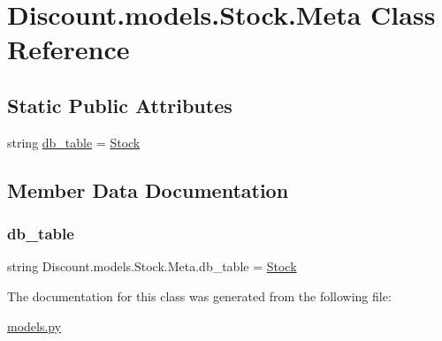 \hypertarget{class_discount_1_1models_1_1_stock_1_1_meta}{}\section{Discount.\+models.\+Stock.\+Meta Class Reference}
\label{class_discount_1_1models_1_1_stock_1_1_meta}
\subsection*{Static Public Attributes}
\begin{DoxyCompactItemize}
\item 
string \hyperlink{class_discount_1_1models_1_1_stock_1_1_meta_ab26387dac75bd8eb0ed36320d1c2a246}{db\+\_\+table} = \textquotesingle{}\hyperlink{class_discount_1_1models_1_1_stock}{Stock}\textquotesingle{}
\end{DoxyCompactItemize}


\subsection{Member Data Documentation}
\mbox{\label{class_discount_1_1models_1_1_stock_1_1_meta_ab26387dac75bd8eb0ed36320d1c2a246}} 
\subsubsection{\texorpdfstring{db\+\_\+table}{db\_table}}
{\footnotesize\ttfamily string Discount.\+models.\+Stock.\+Meta.\+db\+\_\+table = \textquotesingle{}\hyperlink{class_discount_1_1models_1_1_stock}{Stock}\textquotesingle{}\hspace{0.3cm}{\ttfamily [static]}}



The documentation for this class was generated from the following file\+:\begin{DoxyCompactItemize}
\item 
\hyperlink{models_8py}{models.\+py}\end{DoxyCompactItemize}
